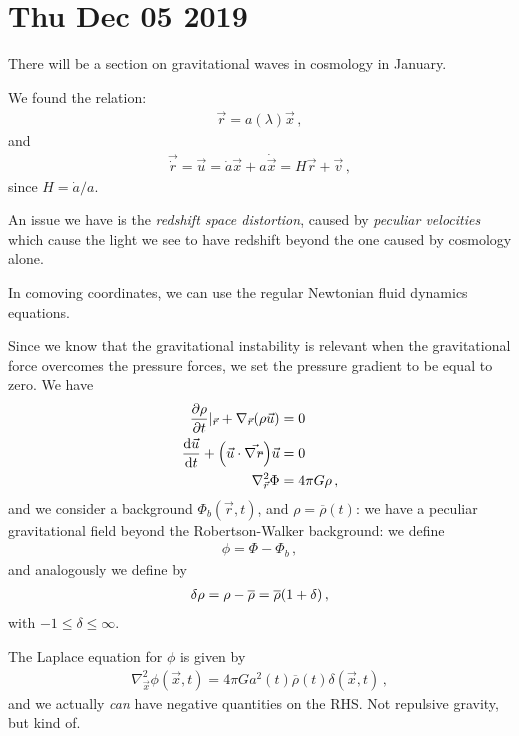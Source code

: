 \documentclass[main.tex]{subfiles}
\begin{document}
\section*{Thu Dec 05 2019}

There will be a section on gravitational waves in cosmology in January. 

We found the relation: 
%
\begin{align}
  \vec{r}  = a(\lambda ) \vec{x}
\,,
\end{align}
%
and 
%
\begin{align}
  \vec{\dot{r}} = \vec{u} = \dot{a} \vec{x} + a \dot{\vec{x}} = H \vec{r} + \vec{v}
\,,
\end{align}
%
since \(H = \dot{a} / a\). 

An issue we have is the \emph{redshift space distortion}, caused by \emph{peculiar velocities} which cause the light we see to have redshift beyond the one caused by cosmology alone. 

In comoving coordinates, we can use the regular Newtonian fluid dynamics equations. 

Since we know that the gravitational instability is relevant when the gravitational force overcomes the pressure forces, we set the pressure gradient to be equal to zero. We have 
%
\begin{subequations}
\begin{align}
  \pdv{\rho }{t} |_{\vec{r}} + \nabla_{\vec{r}} \qty(\rho \vec{u}) &= 0  \\
  \dv{\vec{u}}{t} + \qty(\vec{u} \cdot \vec{\nabla_{\vec{r}}}) \vec{u} &=0  \\
  \nabla_{\vec{r}}^2 \Phi &= 4 \pi G \rho 
\,,
\end{align}
\end{subequations}
%
and we consider a background \(\Phi_b (\vec{r}, t)\), and \(\rho = \overline{\rho}(t)\): we have a peculiar gravitational field beyond the Robertson-Walker background: we define 
%
\begin{align}
  \phi  = \Phi - \Phi_b
\,,
\end{align}
%
and analogously we define by 
%
\begin{align}
  \delta \rho = \rho - \overline{\rho} = \overline{\rho} \qty(1 + \delta )
\,,
\end{align}
%
with \(-1 \leq \delta \leq \infty\). 

The Laplace equation for \(\phi \) is given by 
%
\begin{align}
  \nabla^2_{\vec{x}} \phi (\vec{x}, t) = 4 \pi G a^2(t) \overline{\rho} (t) \delta (\vec{x}, t)
\,,
\end{align}
%
and we actually \emph{can} have negative quantities on the RHS. Not repulsive gravity, but kind of. 
\end{document}
